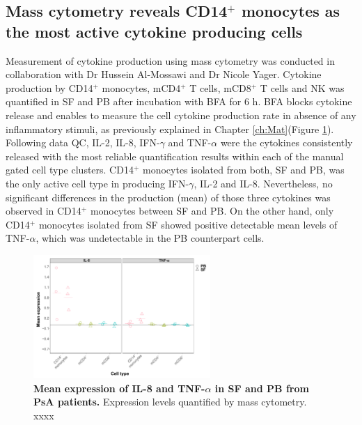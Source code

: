 



\subsection{Mass cytometry reveals CD14$^+$ monocytes as the most active cytokine producing cells}
Measurement of cytokine production using mass cytometry was conducted in collaboration with Dr Hussein Al-Mossawi and Dr Nicole Yager. Cytokine production by CD14$^+$ monocytes, mCD4$^+$ T cells, mCD8$^+$ T cells and NK was quantified in SF and PB after incubation with BFA for 6 h. BFA blocks cytokine release and enables to measure the cell cytokine production rate in absence of any inflammatory stimuli, as previously explained in Chapter \ref{ch:Mat}(Figure \ref{figure:PSA_cytof_cytokines}). Following data QC, IL-2, IL-8, IFN-$\gamma$ and TNF-$\alpha$ were the cytokines consistently released with the most reliable quantification results within each of the manual gated cell type clusters. CD14$^+$ monocytes isolated from both, SF and PB, was the only active cell type in producing IFN-$\gamma$, IL-2 and IL-8. Nevertheless, no significant differences in the production (mean) of those three cytokines was observed in CD14$^+$ monocytes between SF and PB. On the other hand, only CD14$^+$ monocytes isolated from SF showed positive detectable mean levels of TNF-$\alpha$, which was undetectable in the PB counterpart cells. 

\begin{figure}[htbp]
\centering
\includegraphics[width=0.6\textwidth]{./Results3/pdfs/CyTOF_ICS_cytokines_production_IL8_TNF}
\caption[Mean expression of IL-8 and TNF-$\alpha$ in SF and PB from PsA patients.]{\textbf{Mean expression of IL-8 and TNF-$\alpha$ in SF and PB from PsA patients.} Expression levels quantified by mass cytometry. xxxx }
\label{figure:PSA_cytof_cytokines}
\end{figure}


